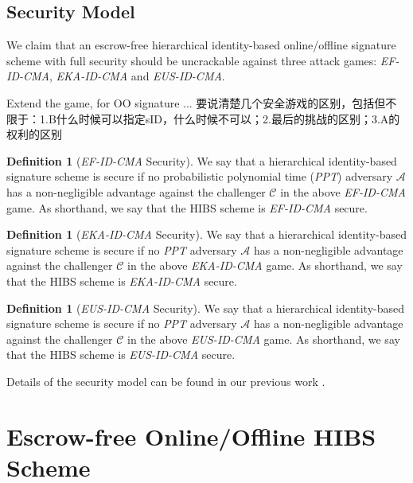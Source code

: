 \documentclass[times]{secauth}
\theoremstyle{definition}
\newtheorem{definition}[theorem]{Definition}
\theoremstyle{remark}
\begin{document}
\subsection{Security Model}
We claim that an escrow-free hierarchical identity-based online/offline signature scheme with full security should be uncrackable against three attack games: \emph{EF-ID-CMA}, \emph{EKA-ID-CMA} and \emph{EUS-ID-CMA}. 
\par
Extend the game, for OO signature ...
要说清楚几个安全游戏的区别，包括但不限于：1.B什么时候可以指定sID，什么时候不可以；2.最后的挑战的区别；3.A的权利的区别

\begin{definition}[\emph{EF-ID-CMA} Security]
We say that a hierarchical identity-based signature scheme is secure if no probabilistic polynomial time (\emph{PPT}) adversary $\mathcal{A}$ has a non-negligible advantage against the challenger $\mathcal{C}$ in the above \emph{EF-ID-CMA} game. 
As shorthand, we say that the HIBS scheme is \emph{EF-ID-CMA} secure.
\end{definition}
\par
\begin{definition}[\emph{EKA-ID-CMA} Security]
We say that a hierarchical identity-based signature scheme is secure if no \emph{PPT} adversary $\mathcal{A}$ has a non-negligible advantage against the challenger $\mathcal{C}$ in the above \emph{EKA-ID-CMA} game. 
As shorthand, we say that the HIBS scheme is \emph{EKA-ID-CMA} secure.
\end{definition}
\begin{definition}[\emph{EUS-ID-CMA} Security]
We say that a hierarchical identity-based signature scheme is secure if no \emph{PPT} adversary $\mathcal{A}$ has a non-negligible advantage against the challenger $\mathcal{C}$ in the above \emph{EUS-ID-CMA} game. 
As shorthand, we say that the HIBS scheme is \emph{EUS-ID-CMA} secure.
\end{definition}
\par
Details of the security model can be found in our previous work \cite{anescrowfree2015chen}.


\section{Escrow-free Online/Offline HIBS Scheme}\label{sec-EFOOHIBS}
\end{document}
